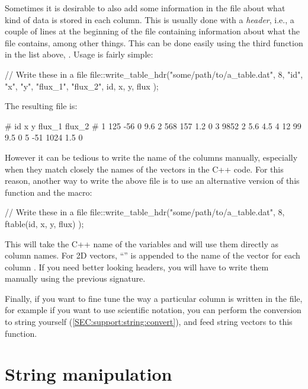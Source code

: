 \documentclass[12pt]{report}
\begin{document}
\begin{itemize}
Sometimes it is desirable to also add some information in the file about what kind of data is stored in each column. This is usually done with a \emph{header}, i.e., a couple of lines at the beginning of the file containing information about what the file contains, among other things. This can be done easily using the third function in the list above, . Usage is fairly simple:
\begin{cppcode}
// Write these in a file
file::write_table_hdr("some/path/to/a_table.dat", 8,
    {"id", "x", "y", "flux_1", "flux_2"},
    id, x, y, flux
);
\end{cppcode}

The resulting file is:
\begin{bashcode}
#     id       x       y  flux_1  flux_2
#
       1     125     -56       0     9.6
       2     568     157     1.2       0
       3    9852       2     5.6     4.5
       4      12      99     9.5       0
       5     -51    1024     1.5       0
\end{bashcode}

However it can be tedious to write the name of the columns manually, especially when they match closely the names of the vectors in the C++ code. For this reason, another way to write the above file is to use an alternative version of this function and the  macro:
\begin{cppcode}
// Write these in a file
file::write_table_hdr("some/path/to/a_table.dat", 8,
    ftable(id, x, y, flux)
);
\end{cppcode}

This will take the C++ name of the variables and will use them directly as column names. For 2D vectors, ``'' is appended to the name of the vector for each column . If you need better looking headers, you will have to write them manually using the previous signature.

Finally, if you want to fine tune the way a particular column is written in the file, for example if you want to use scientific notation, you can perform the conversion to string yourself (\ref{SEC:support:string:convert}), and feed string vectors to this function.

\end{itemize}

\section{String manipulation \label{SEC:support:string}}
\end{document}
